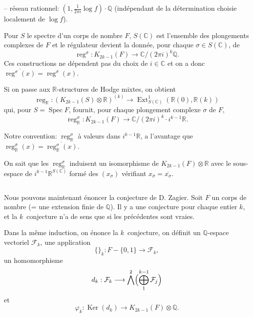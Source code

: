 \documentclass[12pt,a4paper]{article}
\theoremstyle{plain}
\theoremstyle{definition}
\theoremstyle{remark}
\DeclareMathOperator{\Ext}{Ext}
\DeclareMathOperator*{\Ker}{Ker}
\DeclareMathOperator{\reg}{reg}
\DeclareMathOperator{\Spec}{Spec}
\newcommand{\Q}{\mathbb{Q}}
\newcommand{\R}{\mathbb{R}}
\newcommand{\C}{\mathbb{C}}
\newcommand{\F}{\mathcal{F}}
\begin{document}
-- r{\'e}seau rationnel: $(1,\frac{1}{2\pi i}\log f)\cdot\Q$ (ind{\'e}pendant de la d{\'e}termination choisie localement de $\log f$).

Pour $S$ le spectre d'un corps de nombre $F$, $S(\C)$ est l'ensemble des plongements complexes de $F$ et le r{\'e}gulateur devient la donn{\'e}e, pour chaque $\sigma\in S(\C)$, de
\begin{equation*}
\reg^\sigma : K_{2k-1}(F) \longrightarrow \C/(2\pi i)^k\Q.
\end{equation*}
Ces constructions ne d{\'e}pendent pas du choix de $i\in\C$ et on a donc $\overline{\reg^\sigma(x)}=\reg^{\bar{\sigma}}(x)$.

Si on passe aux $\R$-structures de Hodge mixtes, on obtient
\begin{equation*}
\reg_\R : (K_{2k-1}(S)\otimes\R)^{(k)} \longrightarrow \Ext^1_{S(\C)}(\R(0),\R(k))
\end{equation*}
qui, pour $S=\Spec F$, fournit, pour chaque plongement complexe $\sigma$ de $F$,
\begin{equation*}
\reg_\R^\sigma : K_{2k-1}(F) \longrightarrow \C/(2\pi i)^k\cdot i^{k-1}\R.
\end{equation*}

Notre convention: $\reg_\R^\sigma$ {\`a} valeurs dans $i^{k-1}\R$, a l'avantage que $\reg_\R^{\bar{\sigma}}(x)=\overline{\reg_\R^\sigma(x)}$.

On sait que les $\reg_\R^\sigma$ induisent un isomorphisme de $K_{2k-1}(F)\otimes\R$ avec le sous-espace de $i^{k-1}\R^{S(\C)}$ form{\'e} des $(x_\sigma)$ v{\'e}rifiant $x_{\bar{\sigma}}=\overline{x_\sigma}$.

\subsection{}

Nous pouvons maintenant {\'e}noncer la conjecture de D. Zagier. Soit $F$ un corps de nombre (= une extension finie de $\Q$). Il y a une conjecture pour chaque entier $k$, et la $k$\ieme\ conjecture n'a de sens que si les pr{\'e}c\'edentes sont vraies.

Dans la m{\^e}me induction, on {\'e}nonce la $k$\ieme\ conjecture, on d{\'e}finit un $\Q$-espace vectoriel $\F_k$, une application
\begin{equation*}
\{\}_k : F-\{0,1\} \longrightarrow \F_k,
\end{equation*}
un homomorphisme
\begin{equation*}
d_k : \F_k \longrightarrow \bigwedge^2\Bigl(\bigoplus_1^{k-1}\F_j\Bigr)
\end{equation*}
et
\begin{equation*}
\varphi_k : \Ker(d_k) \longrightarrow K_{2k-1}(F)\otimes\Q.
\end{equation*}
\end{document}

